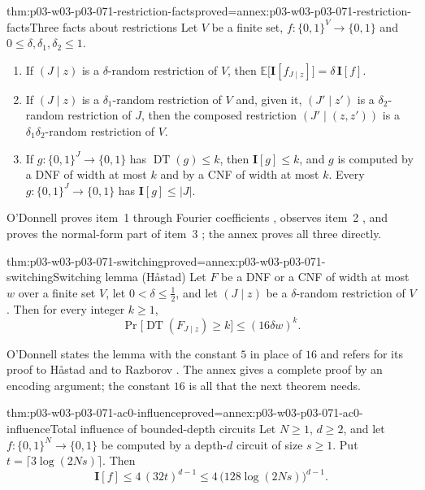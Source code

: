 \begin{hblemma}{thm:p03-w03-p03-071-restriction-facts}{proved=annex:p03-w03-p03-071-restriction-facts}{Three facts about restrictions}
Let \(V\) be a finite set, \(f:\{0,1\}^V\to\{0,1\}\) and
\(0\leq\delta,\delta_1,\delta_2\leq1\).
\begin{enumerate}
\item If \((J\mid z)\) is a \(\delta\)-random restriction of \(V\), then
  \(\mathbb E\bigl[\mathbf I[f_{J\mid z}]\bigr]=\delta\,\mathbf I[f]\).
\item If \((J\mid z)\) is a \(\delta_1\)-random restriction of \(V\) and,
  given it, \((J'\mid z')\) is a \(\delta_2\)-random restriction of \(J\),
  then the composed restriction \((J'\mid(z,z'))\) is a
  \(\delta_1\delta_2\)-random restriction of \(V\).
\item If \(g:\{0,1\}^J\to\{0,1\}\) has \(\operatorname{DT}(g)\leq k\), then
  \(\mathbf I[g]\leq k\), and \(g\) is computed by a DNF of width at most
  \(k\) and by a CNF of width at most \(k\).  Every \(g:\{0,1\}^J\to\{0,1\}\)
  has \(\mathbf I[g]\leq|J|\).
\end{enumerate}
\end{hblemma}

O'Donnell proves item~1 through Fourier coefficients
\cite[cor.~4.18, p.~99]{ODonnell2021AnalysisBooleanArxiv}, observes item~2
\cite[p.~104]{ODonnell2021AnalysisBooleanArxiv}, and proves the normal-form
part of item~3 \cite[prop.~4.5, p.~94]{ODonnell2021AnalysisBooleanArxiv};
the annex proves all three directly.

\begin{hblemma}{thm:p03-w03-p03-071-switching}{proved=annex:p03-w03-p03-071-switching}{Switching lemma (H\aa stad)}
Let \(F\) be a DNF or a CNF of width at most \(w\) over a finite set \(V\),
let \(0<\delta\leq\frac12\), and let \((J\mid z)\) be a \(\delta\)-random
restriction of \(V\).  Then for every integer \(k\geq1\),
\[
  \Pr\bigl[\operatorname{DT}(F_{J\mid z})\geq k\bigr]\leq(16\delta w)^k .
\]
\end{hblemma}

O'Donnell states the lemma with the constant \(5\) in place of \(16\) and
refers for its proof to H\aa stad and to Razborov
\cite[pp.~100--101]{ODonnell2021AnalysisBooleanArxiv}.  The annex gives a
complete proof by an encoding argument; the constant \(16\) is all that the
next theorem needs.

\begin{hbtheorem}{thm:p03-w03-p03-071-ac0-influence}{proved=annex:p03-w03-p03-071-ac0-influence}{Total influence of bounded-depth circuits}
Let \(N\geq1\), \(d\geq2\), and let \(f:\{0,1\}^N\to\{0,1\}\) be computed by
a depth-\(d\) circuit of size \(s\geq1\).  Put
\(t=\lceil3\log(2Ns)\rceil\).  Then
\[
  \mathbf I[f]\leq4\,(32t)^{d-1}\leq4\,\bigl(128\log(2Ns)\bigr)^{d-1}.
\]
\end{hbtheorem}

